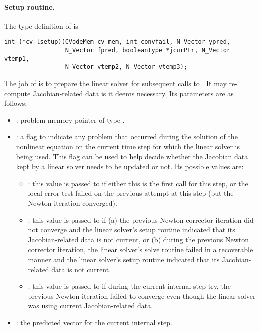 \paragraph{Setup routine.} 
The type definition of  is
\begin{verbatim}
int (*cv_lsetup)(CVodeMem cv_mem, int convfail, N_Vector ypred,
                 N_Vector fpred, booleantype *jcurPtr, N_Vector vtemp1,
                 N_Vector vtemp2, N_Vector vtemp3); 
\end{verbatim}
The job of  is to prepare the linear solver for subsequent 
calls to . It may re-compute Jacobian-related data is it 
deems necessary. Its parameters are as follows:
\begin{itemize}
  
\item {}: problem memory pointer of type .
  
\item {}: a flag to indicate any problem that occurred during  
  the solution of the nonlinear equation on the current time step for which 
  the linear solver is being used. This flag can be used to help decide     
  whether the Jacobian data kept by a {\cvodes} linear solver needs to be updated 
  or not. Its possible values are:
  \begin{itemize}
  \item {}: this value is passed to  if 
    either this is the first call for this step, or the local error test failed on the 
    previous attempt at this step (but the Newton iteration converged).
  \item {}: this value is passed to  if
    (a) the previous Newton corrector iteration did not converge and the linear solver's      
    setup routine indicated that its Jacobian-related data is not current,
    or                            
    (b) during the previous Newton corrector iteration, the linear solver's solve routine  
    failed in a recoverable manner and the linear solver's setup routine indicated that  
    its Jacobian-related data is not current.
  \item {}: this value is passed to  if 
    during the current internal step try, the previous Newton iteration failed to 
    converge even though the linear solver was using current Jacobian-related data.
  \end{itemize}
  
\item {}: the predicted  vector for the current {\cvodes} internal   
  step.                                                   
  

\end{itemize}
